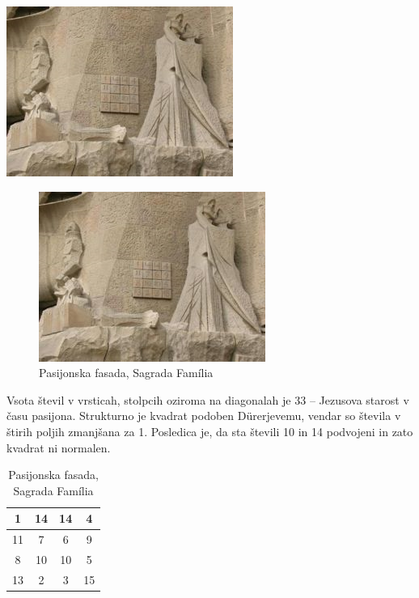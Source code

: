 \documentclass[a4paper,12pt]{article}
\begin{document}
\includegraphics{sagrada.png}
\begin{figure}[h!]
   \centering
   \caption{Pasijonska fasada, Sagrada Família}
   \label{fig:sagrada}
   \includegraphics{sagrada.png}
\end{figure}
Vsota števil v vrsticah, stolpcih oziroma na diagonalah je 33 -- Jezusova starost
v času pasijona. Strukturno je kvadrat podoben Dürerjevemu, vendar so števila
v štirih poljih zmanjšana za 1. Posledica je, da sta števili 10 in 14 podvojeni
in zato kvadrat ni normalen.
%
\begin{table}[h!]
   \centering
   \caption{Pasijonska fasada, Sagrada Família}
   \label{sagrada}
   \begin{tabular}{|c|c|c|c|}
      \hline
      1 & 14 & 14 &  4 \\\hline
      11 &  7 &  6 &  9 \\\hline
       8 & 10 & 10 &  5 \\\hline
      13 &  2 &  3 & 15 \\\hline
   \end{tabular}
\end{table}
\end{document}
